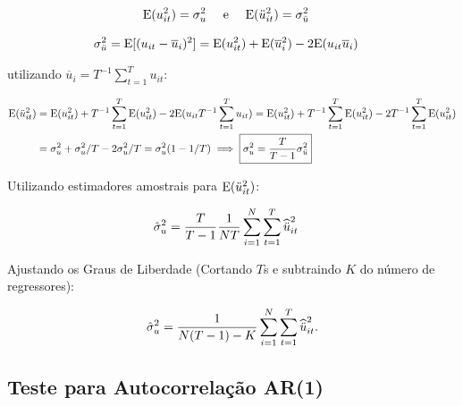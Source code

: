 \documentclass[11pt, oneside, a4paper, article]{article}
\numberwithin{equation}{section}
\begin{document}
\vspace{-1 em} 
\begin{align*}
	\text{E}( u_{it}^2) &= \sigma^2_{u}
	\quad \text{ e } \quad
	\text{E}( \ddot{u}_{it}^2) = \sigma^{2}_{\ddot{u}}
\end{align*}

\vspace{-1 em} 
\begin{align*}
	\sigma^{2}_{\ddot{u}} &=
	\text{E}[ ( u_{it} - \overline{u}_{i})^2] = 
	\text{E}( u_{it}^2) + \text{E}( \overline{u}_{i}^2) - 2 \text{E}( u_{it} \overline{u}_{i})
\end{align*}

\noindent
utilizando $\overline{u}_{i} = T^{-1} \sum_{t=1}^{T} u_{it}$:

\vspace{-1 em} 
\begin{align*}
	\text{E}( \ddot{u}_{it}^2) 
	&=
	\text{E}( u_{it}^2) + T^{-1} \sum_{t=1}^{T} \text{E}( u_{it}^2) - 2 \text{E}( u_{it} T^{-1} \sum_{t=1}^{T} u_{it})
	= 
	\text{E}( u_{it}^2) + T^{-1} \sum_{t=1}^{T} \text{E}( u_{it}^2) - 2T^{-1} \sum_{t=1}^{T} \text{E}( u^2_{it})
	\\
	&= 
	\sigma^2_{u} + \sigma^2_{u}/T - 2\sigma^2_{u}/T = \sigma^2_{u}(1 - 1/T)
	\implies
	\boxed{\sigma^2_{u} = \frac{T}{T-1} \sigma^2_{\ddot{u}} }
\end{align*}

\noindent
Utilizando estimadores amostrais para $\text{E}(\ddot{u}_{it}^{2})$:

\vspace{-1 em} 
\begin{align*}
	\hat{\sigma}_{u}^2
	&= 
	\frac{T}{T-1} \frac{1}{NT}
	\sum_{i=1}^{N} \sum_{t=1}^{T}  
	\widehat{\ddot{u}}_{it}^2
\end{align*}

\noindent
Ajustando os Graus de Liberdade (Cortando $T$s e subtraindo $K$ do número de regressores):

\vspace{-1 em} 
\begin{align}\label{fe:sighat}
	\hat{\sigma}^2_{u} = \frac{1}{N(T-1) - K}
	\sum_{i=1}^{N} \sum_{t=1}^{T} \widehat{\ddot{u}}^2_{it}.
\end{align}

\subsection*{Teste para Autocorrelação AR(1)}
\noindent
\citet[p.275]{wool-2010}
\end{document}
